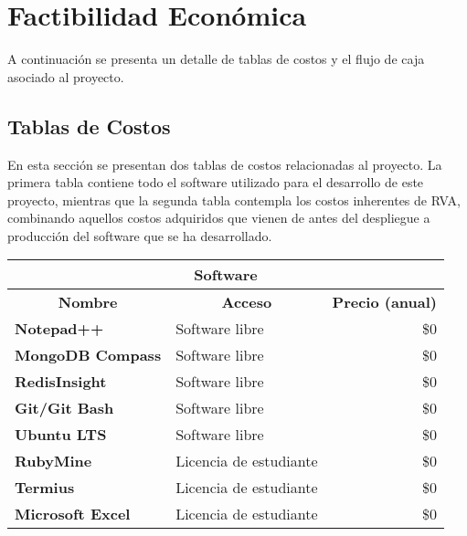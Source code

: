 \section{Factibilidad Económica}
A continuación se presenta un detalle de tablas de costos y el flujo de caja asociado al proyecto. 

\subsection{Tablas de Costos}
\label{feasibility:costs}
En esta sección se presentan dos tablas de costos relacionadas al proyecto. La primera tabla contiene todo el software utilizado para el desarrollo de este proyecto, mientras que la segunda tabla contempla los costos inherentes de RVA, combinando aquellos costos adquiridos que vienen de antes del despliegue a producción del software que se ha desarrollado.

\begin{center}
	\begin{tabular}{ | l | p{5cm} | p{5cm}|}
		\hline
		\multicolumn{3}{|c|}{\textbf{Software}} \\
		\hline
		\multicolumn{1}{|c|}{\textbf{Nombre}} & \multicolumn{1}{|c|}{\textbf{Acceso}} & \multicolumn{1}{|c|}{\textbf{Precio (anual)}} \\
		\hline
		{\textbf{Notepad++}} & Software libre & \multicolumn{1}{|r|}{\$0} \\ \hline

		{\textbf{MongoDB Compass}} & Software libre & \multicolumn{1}{|r|}{\$0} \\ \hline
		
		{\textbf{RedisInsight}} & Software libre & \multicolumn{1}{|r|}{\$0} \\ \hline
		
		{\textbf{Git/Git Bash}} & Software libre & \multicolumn{1}{|r|}{\$0} \\ \hline
		
		{\textbf{Ubuntu LTS}} & Software libre & \multicolumn{1}{|r|}{\$0} \\ \hline
		
		{\textbf{RubyMine}} & Licencia de estudiante & \multicolumn{1}{|r|}{\$0} \\ \hline
		
		{\textbf{Termius}} & Licencia de estudiante & \multicolumn{1}{|r|}{\$0} \\ \hline
		
		{\textbf{Microsoft Excel}} & Licencia de estudiante & \multicolumn{1}{|r|}{\$0} \\ \hline
	\end{tabular}
\end{center}

